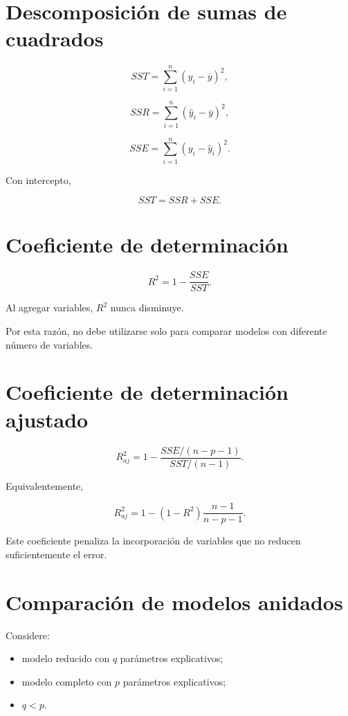 \documentclass[
  spanish,
  11pt,
  letterpaper,
  DIV=11,
  numbers=noendperiod]{scrreprt}
\providecommand{\tightlist}{%
  \setlength{\itemsep}{0pt}\setlength{\parskip}{0pt}}
\theoremstyle{definition}
\theoremstyle{plain}
\theoremstyle{definition}
\theoremstyle{remark}
\begin{document}
\section{Descomposición de sumas de
cuadrados}\label{descomposiciuxf3n-de-sumas-de-cuadrados}

\[
SST
=
\sum_{i=1}^{n}
(y_i-\overline{y})^2,
\]

\[
SSR
=
\sum_{i=1}^{n}
(\widehat{y}_i-\overline{y})^2,
\]

\[
SSE
=
\sum_{i=1}^{n}
(y_i-\widehat{y}_i)^2.
\]

Con intercepto,

\[
SST
=
SSR
+
SSE.
\]

\section{Coeficiente de
determinación}\label{coeficiente-de-determinaciuxf3n-2}

\[
R^2
=
1-
\frac{
SSE
}{
SST
}.
\]

Al agregar variables, \(R^2\) nunca disminuye.

Por esta razón, no debe utilizarse solo para comparar modelos con
diferente número de variables.

\section{Coeficiente de determinación
ajustado}\label{coeficiente-de-determinaciuxf3n-ajustado}

\[
R^2_{aj}
=
1-
\frac{
SSE/(n-p-1)
}{
SST/(n-1)
}.
\]

Equivalentemente,

\[
R^2_{aj}
=
1-
(1-R^2)
\frac{
n-1
}{
n-p-1
}.
\]

Este coeficiente penaliza la incorporación de variables que no reducen
suficientemente el error.

\section{Comparación de modelos
anidados}\label{comparaciuxf3n-de-modelos-anidados}

Considere:

\begin{itemize}
\tightlist
\item
  modelo reducido con \(q\) parámetros explicativos;
\item
  modelo completo con \(p\) parámetros explicativos;
\item
  \(q<p\).
\end{itemize}
\end{document}
